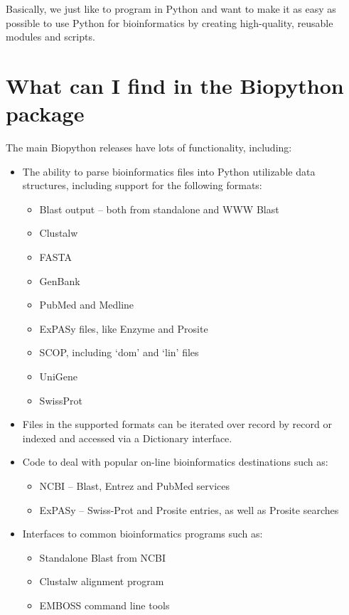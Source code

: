 \documentclass{report}
\begin{document}
Basically, we just like to program in Python and want to make it as easy as possible to use Python for bioinformatics by creating high-quality, reusable modules and scripts.

\section{What can I find in the Biopython package}

The main Biopython releases have lots of functionality, including:

\begin{itemize}
  \item The ability to parse bioinformatics files into Python utilizable data structures, including support for the following formats:

  \begin{itemize}
    \item Blast output -- both from standalone and WWW Blast
    \item Clustalw
    \item FASTA
    \item GenBank
    \item PubMed and Medline
    \item ExPASy files, like Enzyme and Prosite
    \item SCOP, including `dom' and `lin' files
    \item UniGene
    \item SwissProt
  \end{itemize}

  \item Files in the supported formats can be iterated over record by record or indexed and accessed via a Dictionary interface.

  \item Code to deal with popular on-line bioinformatics destinations such as:

  \begin{itemize}
    \item NCBI -- Blast, Entrez and PubMed services
    \item ExPASy -- Swiss-Prot and Prosite entries, as well as Prosite searches
  \end{itemize}

  \item Interfaces to common bioinformatics programs such as:

  \begin{itemize}
    \item Standalone Blast from NCBI
    \item Clustalw alignment program
    \item EMBOSS command line tools
  \end{itemize}


\end{itemize}
\end{document}
